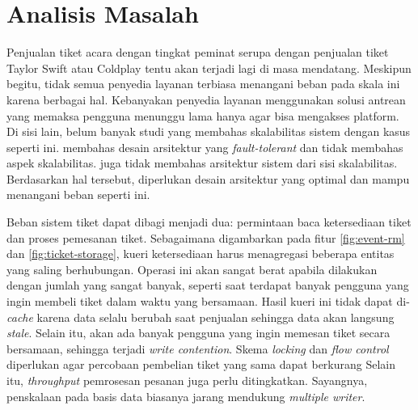 \section{Analisis Masalah}

Penjualan tiket acara dengan tingkat peminat serupa dengan penjualan tiket Taylor Swift atau Coldplay tentu akan terjadi lagi di masa mendatang. Meskipun begitu, tidak semua penyedia layanan terbiasa menangani beban pada skala ini karena berbagai hal. Kebanyakan penyedia layanan menggunakan solusi antrean yang memaksa pengguna menunggu lama hanya agar bisa mengakses platform. Di sisi lain, belum banyak studi yang membahas skalabilitas sistem dengan kasus seperti ini. \cite{microservicesEventDriven} membahas desain arsitektur yang \textit{fault-tolerant} dan tidak membahas aspek skalabilitas. \cite{backendForTicketing} juga tidak membahas arsitektur sistem dari sisi skalabilitas. Berdasarkan hal tersebut, diperlukan desain arsitektur yang optimal dan mampu menangani beban seperti ini.

Beban sistem tiket dapat dibagi menjadi dua: permintaan baca ketersediaan tiket dan proses pemesanan tiket. Sebagaimana digambarkan pada fitur \ref{fig:event-rm} dan \ref{fig:ticket-storage}, kueri ketersediaan harus menagregasi beberapa entitas yang saling berhubungan. Operasi ini akan sangat berat apabila dilakukan dengan jumlah yang sangat banyak, seperti saat terdapat banyak pengguna yang ingin membeli tiket dalam waktu yang bersamaan. Hasil kueri ini tidak dapat di-\textit{cache} karena data selalu berubah saat penjualan sehingga data akan langsung \textit{stale}. Selain itu, akan ada banyak pengguna yang ingin memesan tiket secara bersamaan, sehingga terjadi \textit{write contention}. Skema \textit{locking} dan \textit{flow control} diperlukan agar percobaan pembelian tiket yang sama dapat berkurang Selain itu, \textit{throughput} pemrosesan pesanan juga perlu ditingkatkan. Sayangnya, penskalaan pada basis data biasanya jarang mendukung \textit{multiple writer}.